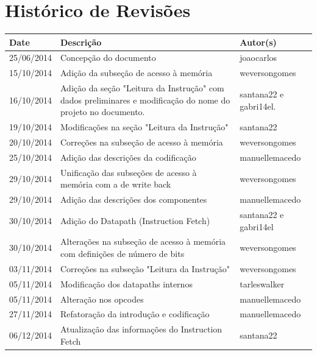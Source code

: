 \documentclass{report}
\begin{document}
\capa
%

\chapter*{Histórico de Revisões}
  \vspace*{1cm}
  \begin{table}[ht]
    \centering
    \begin{tabular}[pos]{|m{2cm} | m{8cm} | m{4cm}|} 
      \hline
      \cellcolor[gray]{0.9}
      \textbf{Date} & \cellcolor[gray]{0.9}\textbf{Descrição} & \cellcolor[gray]{0.9}\textbf{Autor(s)}\\
      \hline
      25/06/2014 & Concepção do documento & joaocarlos \\ \hline
      15/10/2014 & Adição da subseção de acesso à memória & weversongomes \\ \hline
      16/10/2014 & Adição da seção "Leitura da Instrução" com dados preliminares e modificação do nome do projeto no documento. & santana22 e gabri14el.\\ \hline
      19/10/2014 & Modificações na seção "Leitura da Instrução" & santana22 \\ \hline
      20/10/2014 & Correções na subseção de acesso à memória & weversongomes \\ \hline
      25/10/2014 & Adição das descrições da codificação & manuellemacedo \\ \hline
      29/10/2014 & Unificação das subseções de acesso à memória com a de write back & weversongomes \\ \hline
      29/10/2014 & Adição das descrições dos componentes & manuellemacedo \\ \hline
      30/10/2014 & Adição do Datapath (Instruction Fetch) & santana22 e gabri14el \\ \hline
      30/10/2014 & Alterações na subseção de acesso à memória com definições de número de bits & weversongomes \\ \hline
      03/11/2014 & Correções na subseção "Leitura da Instrução" & weversongomes \\ \hline
      05/11/2014 & Modificação dos datapaths internos & tarleswalker \\ \hline
      05/11/2014 & Alteração nos opcodes & manuellemacedo \\ \hline
      27/11/2014 & Refatoração da introdução e codificação & manuellemacedo \\ \hline
      06/12/2014 & Atualização das informações do Instruction Fetch & santana22 \\ \hline
    \end{tabular}
  \end{table}
\end{document}
